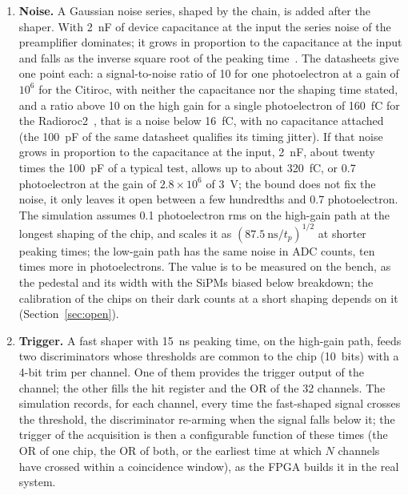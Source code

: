 \documentclass[11pt]{article}
\begin{document}
\begin{enumerate}
  semi-Gaussian itself; an earlier version of this model treated the
  Citiroc that way.
  The datasheet states the order of the shaper and nothing more; the exact
  response is a parameter to be checked against a single-photoelectron
  waveform if one can be probed on the test board.
\item {\bf Noise.} A Gaussian noise series, shaped by the chain, is added
  after the shaper. With 2~nF of device capacitance at the input the series
  noise of the preamplifier dominates; it grows in proportion to the
  capacitance at the input and falls as the inverse square root of the
  peaking time~\cite{spieler}. The datasheets give one point each: a
  signal-to-noise ratio of 10 for one photoelectron at a gain of $10^6$
  for the Citiroc, with neither the capacitance nor the shaping time
  stated, and a ratio above 10 on the high gain for a single
  photoelectron of 160~fC for the Radioroc2~\cite{radioroc}, that is a
  noise below 16~fC, with no capacitance attached (the 100~pF of the same
  datasheet qualifies its timing jitter). If that noise grows in
  proportion to the capacitance at the input, 2~nF, about twenty times
  the 100~pF of a typical test, allows up to about 320~fC, or 0.7
  photoelectron at the gain of $2.8\times10^6$ of 3~V; the bound does not
  fix the noise, it only leaves it open between a few hundredths and
  0.7 photoelectron. The simulation assumes 0.1 photoelectron rms on
  the high-gain path at the longest shaping of the chip, and scales it as
  $(87.5~\mathrm{ns}/t_p)^{1/2}$ at shorter peaking times; the low-gain
  path has the same noise in ADC counts, ten times more in photoelectrons.
  The value is to be measured on the bench, as the pedestal and its width
  with the SiPMs biased below breakdown; the calibration of the chips on
  their dark counts at a short shaping depends on it
  (Section~\ref{sec:open}).
\item {\bf Trigger.} A fast shaper with 15~ns peaking time, on the high-gain
  path, feeds two discriminators whose thresholds are common to the chip
  (10~bits) with a 4-bit trim per channel. One of them provides the trigger
  output of the channel; the other fills the hit register and the OR of the
  32 channels. The simulation records, for each channel, every time the
  fast-shaped signal crosses the threshold, the discriminator re-arming when
  the signal falls below it; the trigger of the acquisition is then a
  configurable function of these times (the OR of one chip, the OR of both,
  or the earliest time at which $N$ channels have crossed within a
  coincidence window), as the FPGA builds it in the real system.

\end{enumerate}
\end{document}
